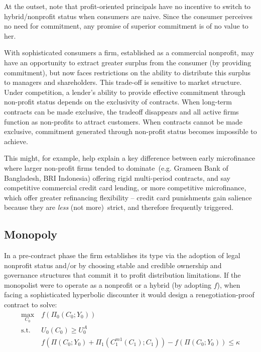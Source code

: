 \documentclass[11pt,english]{article}
\theoremstyle{plain}
\theoremstyle{definition}
\begin{document}
At the outset, note that profit-oriented principals
have no incentive to switch to hybrid/nonprofit status when consumers
are naive. Since the consumer perceives no need for commitment,
any promise of superior commitment is of no value to her. 

With sophisticated consumers a firm, established as a commercial nonprofit, may have  an opportunity to extract greater surplus
from the consumer (by providing commitment), but now faces restrictions
on the ability to distribute this surplus to managers and shareholders.
This trade-off is sensitive to market structure. Under competition,
a lender's ability to provide effective commitment through non-profit
status depends on the exclusivity of contracts. When long-term contracts
can be made exclusive, the tradeoff disappears and all active firms
function as non-profits to attract customers. When contracts cannot be made exclusive, commitment generated through non-profit
status becomes impossible to achieve.

This might, for example, help explain a key difference between early microfinance
where  larger non-profit 
firms tended to dominate\ (e.g. Grameen Bank of Bangladesh, BRI Indonesia) offering rigid multi-period contracts, and say competitive
commercial credit card lending, or more competitive microfinance, which offer greater refinancing flexibility -- credit card punishments gain salience because they are\textit{ less}
(not more)\ strict, and therefore frequently triggered.

\subsection{Monopoly}

In a pre-contract phase the firm  establishes its type via
the adoption of legal nonprofit status and/or by choosing stable and credible
ownership and governance structures that commit it to profit distribution
limitations. If the monopolist were to operate as a nonprofit or
a hybrid (by adopting \( f\)), when facing a sophisticated hyperbolic discounter it would
design a renegotiation-proof contract to solve: 
\begin{align}
\underset{C_{0}}{\text{max}} & \ f\left(\Pi_{0}\left(C_{0};Y_{0}\right)\right)\\
\text{s.t.} & \ U_{0}\left(C_{0}\right)\geq U_{0}^{A}\\
 & \ f\left(\Pi\left(C_{0};Y_{0}\right)+\Pi_{1}\left(C_{1}^{m1}\left(C_{1}\right);C_{1}\right)\right)-f\left(\Pi\left(C_{0};Y_{0}\right)\right)\leq\kappa\label{eq:no-reneg-np}
\end{align}
\end{document}
